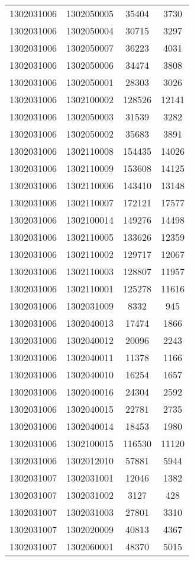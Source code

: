 \begin{longtable}{llcc}
1302031006 & 1302050005 & 35404 & 3730\\
1302031006 & 1302050004 & 30715 & 3297\\
1302031006 & 1302050007 & 36223 & 4031\\
1302031006 & 1302050006 & 34474 & 3808\\
1302031006 & 1302050001 & 28303 & 3026\\
1302031006 & 1302100002 & 128526 & 12141\\
1302031006 & 1302050003 & 31539 & 3282\\
1302031006 & 1302050002 & 35683 & 3891\\
1302031006 & 1302110008 & 154435 & 14026\\
1302031006 & 1302110009 & 153608 & 14125\\
1302031006 & 1302110006 & 143410 & 13148\\
1302031006 & 1302110007 & 172121 & 17577\\
1302031006 & 1302100014 & 149276 & 14498\\
1302031006 & 1302110005 & 133626 & 12359\\
1302031006 & 1302110002 & 129717 & 12067\\
1302031006 & 1302110003 & 128807 & 11957\\
1302031006 & 1302110001 & 125278 & 11616\\
1302031006 & 1302031009 & 8332 & 945\\
1302031006 & 1302040013 & 17474 & 1866\\
1302031006 & 1302040012 & 20096 & 2243\\
1302031006 & 1302040011 & 11378 & 1166\\
1302031006 & 1302040010 & 16254 & 1657\\
1302031006 & 1302040016 & 24304 & 2592\\
1302031006 & 1302040015 & 22781 & 2735\\
1302031006 & 1302040014 & 18453 & 1980\\
1302031006 & 1302100015 & 116530 & 11120\\
1302031006 & 1302012010 & 57881 & 5944\\
1302031007 & 1302031001 & 12046 & 1382\\
1302031007 & 1302031002 & 3127 & 428\\
1302031007 & 1302031003 & 27801 & 3310\\
1302031007 & 1302020009 & 40813 & 4367\\
1302031007 & 1302060001 & 48370 & 5015\\

\end{longtable}
